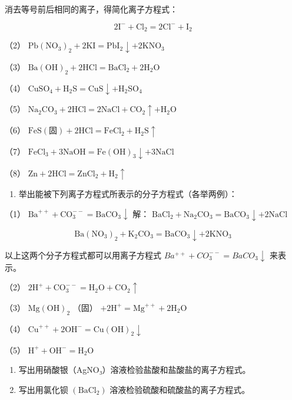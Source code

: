 消去等号前后相同的离子，得简化离子方程式：

\[
2 \mathrm{I} ^ {-} + \mathrm{Cl} _ {2} = 2 \mathrm{Cl} ^ {-} + \mathrm{I} _ {2}
\]

（2） \(\mathrm{Pb(NO_3)_2 + 2KI = PbI_2\downarrow + 2KNO_3}\)

（3）
\(\mathrm{Ba(OH)}_2 + 2\mathrm{HCl} = \mathrm{BaCl}_2 + 2\mathrm{H}_2\mathrm{O}\)

（4） \(\mathrm{CuSO_4 + H_2S = CuS\downarrow + H_2SO_4}\)

（5）
\(\mathrm{Na}_{2} \mathrm{CO}_{3} + 2 \mathrm{HCl} = 2 \mathrm{NaCl} + \mathrm{CO}_{2} \uparrow + \mathrm{H}_{2} \mathrm{O}\)

（6）
\(\mathrm{FeS(固)} + 2\mathrm{HCl} = \mathrm{FeCl}_2 + \mathrm{H}_2\mathrm{S}\uparrow\)

（7）
\(\mathrm{FeCl}_3 + 3\mathrm{NaOH} = \mathrm{Fe(OH)}_3\downarrow +3\mathrm{NaCl}\)

（8）
\(\mathrm{Zn} + 2\mathrm{HCl} = \mathrm{ZnCl}_2 + \mathrm{H}_2\uparrow\)

\begin{enumerate}[start=2]
\item
  举出能被下列离子方程式所表示的分子方程式（各举两例）：
\end{enumerate}

（1）
\(\mathrm{Ba}^{++} + \mathrm{CO}_{3}^{--} = \mathrm{BaCO}_{3}\downarrow\)
解：
\(\mathrm{BaCl}_2 + \mathrm{Na}_2\mathrm{CO}_3 = \mathrm{BaCO}_3\downarrow +2\mathrm{NaCl}\)

\[
\mathrm{Ba} \left(\mathrm{NO} _ {3}\right) _ {2} + \mathrm{K} _ {2} \mathrm{CO} _ {3} = \mathrm{BaCO} _ {3} \downarrow + 2 \mathrm{KNO} _ {3}
\]

以上这两个分子方程式都可以用离子方程式
\(Ba^{++} + CO_{3}^{--} = BaCO_{3}\downarrow\) 来表示。

（2）
\(2\mathrm{H}^{+} + \mathrm{CO}_{3}^{--} = \mathrm{H}_{2}\mathrm{O} + \mathrm{CO}_{2}\uparrow\)

（3） \(\mathrm{Mg(OH)}_2\) （固）
\(+2\mathrm{H}^{+} = \mathrm{Mg}^{++} + 2\mathrm{H}_{2}\mathrm{O}\)

（4）
\(\mathrm{Cu}^{++} + 2\mathrm{OH}^{-} = \mathrm{Cu(OH)}_{2}\downarrow\)

（5） \(\mathrm{H}^{+} + \mathrm{OH}^{-} = \mathrm{H}_{2}\mathrm{O}\)

\begin{enumerate}[start=3]
\item
  写出用硝酸银（AgNO₃）溶液检验盐酸和盐酸盐的离子方程式。
\item
  写出用氯化钡 \(\left(\mathrm{BaCl}_{2}\right)\)
  溶液检验硫酸和硫酸盐的离子方程式。
\end{enumerate}

